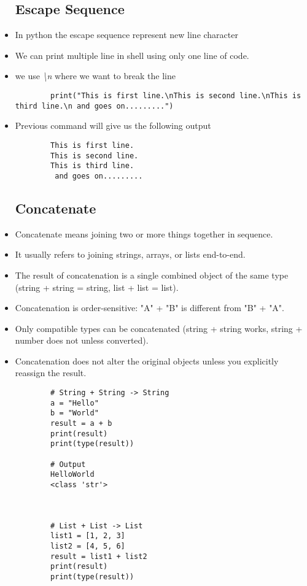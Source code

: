 \documentclass[a4paper,11pt]{article}
\theoremstyle{mytheor}
\begin{document}
\begin{itemize}
	\subsection{Escape Sequence}
	\item In python the escape sequence represent new line character
	\item We can print multiple line in shell using only one line of code.
	\item we use \textit{\textbackslash n} where we want to break the line
	\begin{lstlisting}
		print("This is first line.\nThis is second line.\nThis is third line.\n and goes on.........")
	\end{lstlisting}
	\item Previous command will give us the following output
	\begin{lstlisting}
		This is first line.
		This is second line.
		This is third line.
		 and goes on.........
	\end{lstlisting}
	\subsection{Concatenate}
	\item Concatenate means joining two or more things together in sequence.
	
	\item It usually refers to joining strings, arrays, or lists end-to-end.
	
	\item The result of concatenation is a single combined object of the same type (string + string = string, list + list = list).
	
	\item Concatenation is order-sensitive: "A" + "B" is different from "B" + "A".
	
	\item Only compatible types can be concatenated (string + string works, string + number does not unless converted).
	
	\item Concatenation does not alter the original objects unless you explicitly reassign the result.
	\begin{lstlisting}
		# String + String -> String
		a = "Hello"
		b = "World"
		result = a + b
		print(result)
		print(type(result))
		
		# Output
		HelloWorld
		<class 'str'>
		
		
		
		# List + List -> List
		list1 = [1, 2, 3]
		list2 = [4, 5, 6]
		result = list1 + list2
		print(result)
		print(type(result))
		

\end{lstlisting}
\end{itemize}
\end{document}
